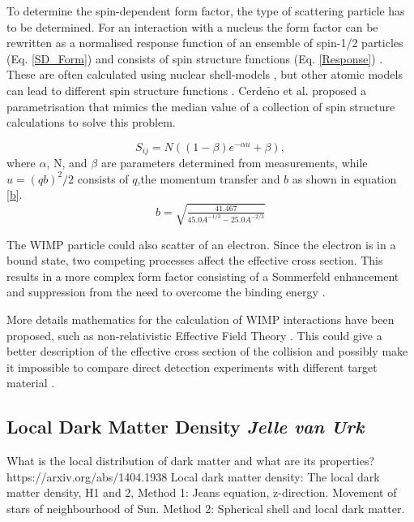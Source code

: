 \documentclass{article}
\begin{document}
To determine the spin-dependent form factor, the type of scattering particle has to be determined. For an interaction with a nucleus the form factor can be rewritten as a normalised response function of an ensemble of spin-1/2 particles (Eq. \ref{SD_Form}) and consists of spin structure functions (Eq. \ref{Response}) \cite{Cannoni:2011iu}. These are often calculated using nuclear shell-models \cite{Ressell:1997kx,Toivanen:2009zza}, but other atomic models can lead to different spin structure functions \cite{Ellis:1987sh, Engel:1989ix, Iachello:1990ut}. Cerde$\tilde{\text{n}}$o et al.\cite{Cerdeno:2012ix} proposed a parametrisation that mimics the median value of a collection of spin structure calculations to solve this problem. 

\begin{equation}
    S_{ij} = N((1-\beta)e^{-\alpha u} + \beta), 
\end{equation}
where $\alpha$, N, and $\beta$ are parameters determined from measurements, while $u = (qb)^2/2$ consists of $q$,the momentum transfer and $b$ as shown in equation \ref{b}.
 \begin{equation} \label{b}
     b = \sqrt{\tfrac{41.467}{45.0A^{-1/3}-25.0A^{-2/3}}}
 \end{equation}

The WIMP particle could also scatter of an electron. Since the electron is in a bound state, two competing processes affect the effective cross section. This results in a more complex form factor consisting of a Sommerfeld enhancement \cite{ArkaniHamed:2008qn} and suppression from the need to overcome the binding energy \cite{Essig:2011nj}.

More details mathematics for the calculation of WIMP interactions have been proposed, such as non-relativistic Effective Field Theory \cite{Fitzpatrick:2012ib}. This could give a better description of the effective cross section of the collision and possibly make it impossible to compare direct detection experiments with different target material \cite{Schneck:2015eqa}. 

\subsection{Local Dark Matter Density \small{\textit{Jelle van Urk}}} \label{Local_DM_Density}

What is the local distribution of dark matter and what are its properties?
https://arxiv.org/abs/1404.1938
Local dark matter density:
The local dark matter density, H1 and 2, 
Method 1: Jeans equation, z-direction. Movement of stars of neighbourhood of Sun.  
Method 2: Spherical shell and local dark matter. 
\end{document}
